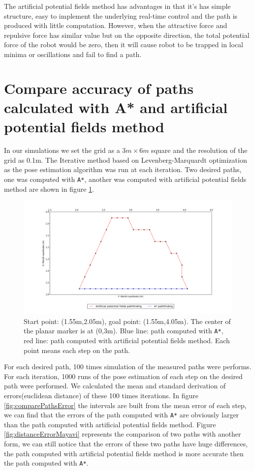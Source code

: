 The artificial potential fields method has advantages in that it's has simple structure, easy to implement the underlying real-time control and the path is produced with little computation. However, when the attractive force and repulsive force has similar value but on the opposite direction, the total potential force of the robot would be zero, then it will cause robot to be trapped in local minima or oscillations and fail to find a path\cite{RoboTemad2}\cite{wiki_motion_planning}.


\section{Compare accuracy of paths calculated with A* and artificial potential fields method}

In our simulations we set the grid as a $3m \times 6m$ square and the resolution of the grid as 0.1m. The Iterative method based on Levenberg-Marquardt optimization as the pose estimation algorithm was run at each iteration\cite{SOLVEPNP_ITERATIVE}.
Two desired paths, one was computed with \texttt{A*}, another was computed with artificial potential fields method are shown in figure \ref{fig:comparePaths}.
\begin{figure}[H]
\centering
\includegraphics[scale=0.3]{./fig/comparePaths.png}
\caption{Start point: (1.55m,2.05m), goal point: (1.55m,4.05m). The center of the planar marker is at (0,3m). Blue line: path computed with \texttt{A*}, red line: path computed with artificial potential fields method. Each point means each step on the path.}
\label{fig:comparePaths}
\end{figure}

For each desired path, 100 times simulation of the measured paths were performs. For each iteration, 1000 runs of the pose estimation of each step on the desired path were performed. We calculated the mean and standard derivation of errors(euclidean distance) of these 100 times iterations. 
In figure \ref{fig:comparePathsError} the intervals are built from the mean error of each step, we can find that the errors of the path computed with \texttt{A*} are obviously larger than the path computed with artificial potential fields method. Figure \ref{fig:distanceErrorMayavi} represents the comparison of two paths with another form, we can still notice that the errors of these two paths have huge differences, the path computed with artificial potential fields method is more accurate then the path computed with \texttt{A*}.

